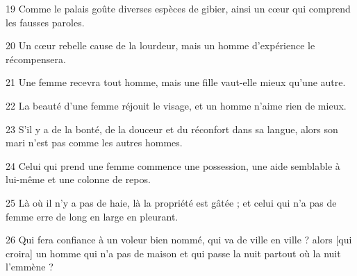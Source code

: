\par 19 Comme le palais goûte diverses espèces de gibier, ainsi un cœur qui comprend les fausses paroles.
\par 20 Un cœur rebelle cause de la lourdeur, mais un homme d'expérience le récompensera.
\par 21 Une femme recevra tout homme, mais une fille vaut-elle mieux qu'une autre.
\par 22 La beauté d'une femme réjouit le visage, et un homme n'aime rien de mieux.
\par 23 S'il y a de la bonté, de la douceur et du réconfort dans sa langue, alors son mari n'est pas comme les autres hommes.
\par 24 Celui qui prend une femme commence une possession, une aide semblable à lui-même et une colonne de repos.
\par 25 Là où il n'y a pas de haie, là la propriété est gâtée ; et celui qui n'a pas de femme erre de long en large en pleurant.
\par 26 Qui fera confiance à un voleur bien nommé, qui va de ville en ville ? alors [qui croira] un homme qui n'a pas de maison et qui passe la nuit partout où la nuit l'emmène ?


